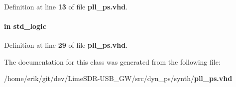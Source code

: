 \paragraph[{std\+\_\+logic\+\_\+1164}]{\hspace{0.3cm}{\ttfamily [Package]}}\label{classpll__ps_acd03516902501cd1c7296a98e22c6fcb}


Definition at line {\bf 13} of file {\bf pll\+\_\+ps.\+vhd}.

\paragraph[{updown}]{ {\bfseries \textcolor{keywordflow}{in}\textcolor{vhdlchar}{ }} {\bfseries \textcolor{comment}{std\+\_\+logic}\textcolor{vhdlchar}{ }} \hspace{0.3cm}{\ttfamily [Port]}}\label{classpll__ps_a3ea4b39f7f6f9c37ee52d57bdb467b1a}


Definition at line {\bf 29} of file {\bf pll\+\_\+ps.\+vhd}.



The documentation for this class was generated from the following file\+:\begin{DoxyCompactItemize}
\item 
/home/erik/git/dev/\+Lime\+S\+D\+R-\/\+U\+S\+B\+\_\+\+G\+W/src/dyn\+\_\+ps/synth/{\bf pll\+\_\+ps.\+vhd}\end{DoxyCompactItemize}
